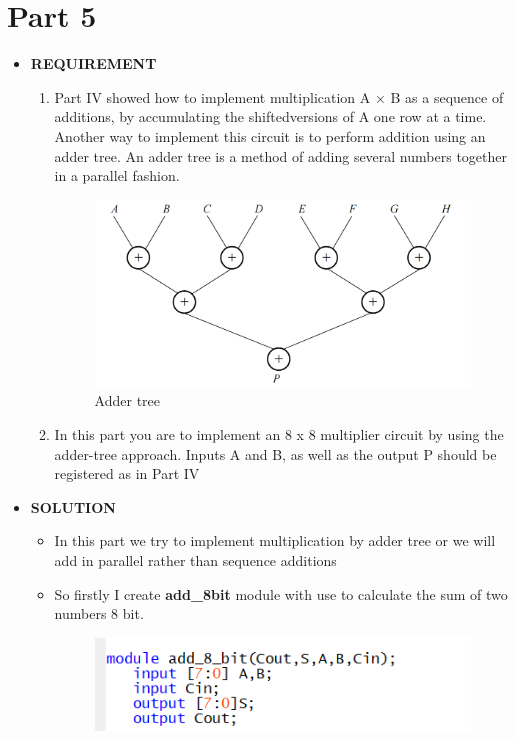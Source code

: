 \section{Part 5}
\begin{itemize}
    \item []\textbf{REQUIREMENT}
        \begin{enumerate}
            \item Part IV showed how to implement multiplication A × B as a sequence of additions, by accumulating the shiftedversions of A one row at a time. Another way to implement this circuit is to perform addition using an adder tree. An adder tree is a method of adding several numbers together in a parallel fashion.
                \begin{figure}[h]
                    \centering
                    \includegraphics[width=\textwidth]{source/picture/Lab6/lab6_adder_treee.png}
                    \caption{Adder tree}
                \end{figure}
            \item In this part you are to implement an 8 x 8 multiplier circuit by using the adder-tree approach. Inputs A and B, as well as the output P should be registered as in Part IV
        \end{enumerate}
    \item []\textbf{SOLUTION}
        \begin{itemize}
            \item []In this part we try to implement multiplication by adder tree or we will add in parallel rather than sequence additions
            \item []So firstly I create \textbf{add\_8bit} module with use to calculate the sum of two numbers 8 bit.
                \begin{figure}[h]
                    \centering
                    \includegraphics[width=\textwidth]{source/picture/Lab6/Lab6_add8bit.png}

\end{figure}
\end{itemize}
\end{itemize}
